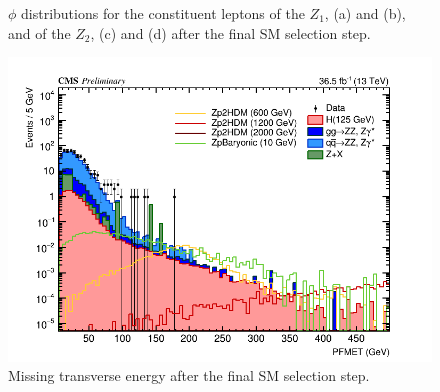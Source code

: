 \begin{figure}[tbh]
\begin{subfigure}{0.50\textwidth}
\caption{}
\end{subfigure}
\caption{$\phi$ distributions for the constituent leptons of the $Z_1$, (a) and (b), and of the $Z_2$, (c) and (d) after the final SM selection step.}
\label{fig:leptkinsm3}
\end{figure}

\begin{figure}[tbh]
\centering
\includegraphics[width=5.5in]{figures/hist_hmet_CR.png}
    \caption{Missing transverse energy after the final SM selection step.}
    \label{fig:met8}
\end{figure}




